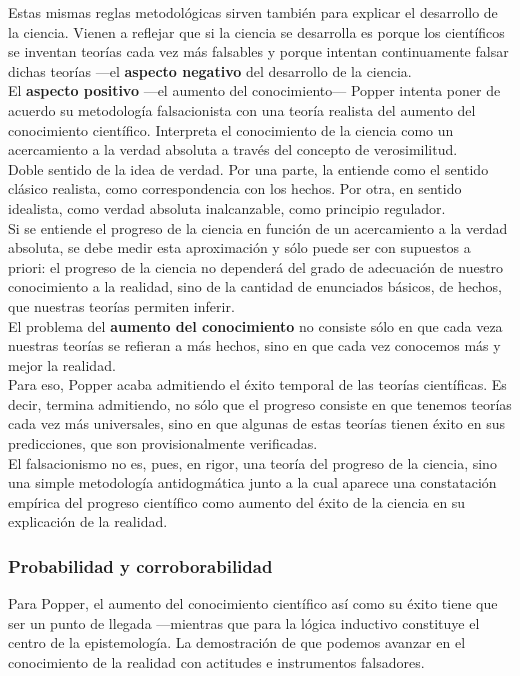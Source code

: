 \documentclass[a4paper, 11pt, twocolumn, spanish]{article}
\begin{document}
Estas mismas reglas metodológicas sirven también para explicar el
desarrollo de la ciencia. Vienen a reflejar que si la ciencia se
desarrolla es porque los científicos se inventan teorías cada vez más
falsables y porque intentan continuamente falsar dichas teorías —el
\textbf{aspecto negativo} del desarrollo de la ciencia.\\[0pt]
El \textbf{aspecto positivo} —el aumento del conocimiento— Popper intenta
poner de acuerdo su metodología falsacionista con una teoría realista
del aumento del conocimiento científico. Interpreta el conocimiento de
la ciencia como un acercamiento a la verdad absoluta a través del
concepto de verosimilitud.\\[0pt]

Doble sentido de la idea de verdad. Por una parte, la entiende como el
sentido clásico realista, como correspondencia con los hechos. Por
otra, en sentido idealista, como verdad absoluta inalcanzable, como
principio regulador.\\[0pt]
Si se entiende el progreso de la ciencia en función de un acercamiento
a la verdad absoluta, se debe medir esta aproximación y sólo puede ser
con supuestos a priori: el progreso de la ciencia no dependerá del
grado de adecuación de nuestro conocimiento a la realidad, sino de la
cantidad de enunciados básicos, de hechos, que nuestras teorías
permiten inferir.\\[0pt]

El problema del \textbf{aumento del conocimiento} no consiste sólo en que
cada veza nuestras teorías se refieran a más hechos, sino en que cada
vez conocemos más y mejor la realidad.\\[0pt]
Para eso, Popper acaba admitiendo el éxito temporal de las teorías
científicas. Es decir, termina admitiendo, no sólo que el progreso
consiste en que tenemos teorías cada vez más universales, sino en que
algunas de estas teorías tienen éxito en sus predicciones, que son
provisionalmente verificadas.\\[0pt]
El falsacionismo no es, pues, en rigor, una teoría del progreso de la
ciencia, sino una simple metodología antidogmática junto a la cual
aparece una constatación empírica del progreso científico como aumento
del éxito de la ciencia en su explicación de la realidad.

\subsubsection{Probabilidad y corroborabilidad}
\label{sec:org54a4e21}
Para Popper, el aumento del conocimiento científico así como su éxito
tiene que ser un punto de llegada —mientras que para la lógica
inductivo constituye el centro de la epistemología. La demostración de
que podemos avanzar en el conocimiento de la realidad con actitudes e
instrumentos falsadores.\\[0pt]
\end{document}
